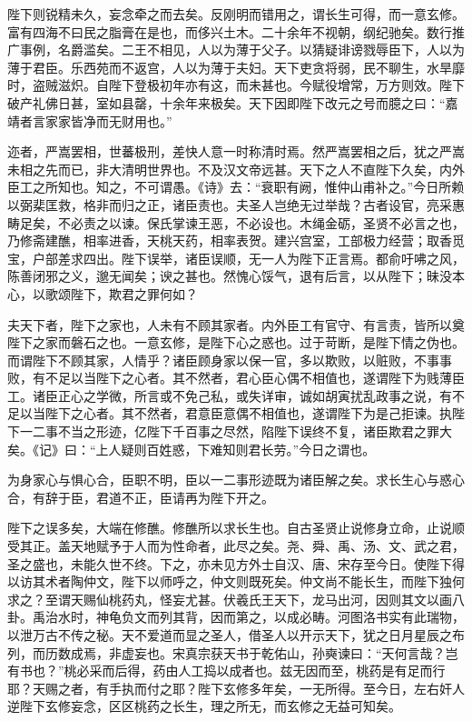 \documentclass[UTF8,titlepage,oneside]{ctexbook}
\begin{document}
陛下则锐精未久，妄念牵之而去矣。反刚明而错用之，谓长生可得，而一意玄修。富有四海不曰民之脂膏在是也，而侈兴土木。二十余年不视朝，纲纪驰矣。数行推广事例，名爵滥矣。二王不相见，人以为薄于父子。以猜疑诽谤戮辱臣下，人以为薄于君臣。乐西苑而不返宫，人以为薄于夫妇。天下吏贪将弱，民不聊生，水旱靡时，盗贼滋炽。自陛下登极初年亦有这，而未甚也。今赋役增常，万方则效。陛下破产礼佛日甚，室如县罄，十余年来极矣。天下因即陛下改元之号而臆之曰：“嘉靖者言家家皆净而无财用也。”

迩者，严嵩罢相，世蕃极刑，差快人意一时称清时焉。然严嵩罢相之后，犹之严嵩未相之先而已，非大清明世界也。不及汉文帝远甚。天下之人不直陛下久矣，内外臣工之所知也。知之，不可谓愚。《诗》去：“衰职有阙，惟仲山甫补之。”今日所赖以弼棐匡救，格非而归之正，诸臣责也。夫圣人岂绝无过举哉？古者设官，亮采惠畴足矣，不必责之以谏。保氏掌谏王恶，不必设也。木绳金砺，圣贤不必言之也，乃修斋建醮，相率进香，天桃天药，相率表贺。建兴宫室，工部极力经营；取香觅宝，户部差求四出。陛下误举，诸臣误顺，无一人为陛下正言焉。都俞吁咈之风，陈善闭邪之义，邈无闻矣；谀之甚也。然愧心馁气，退有后言，以从陛下；昧没本心，以歌颂陛下，欺君之罪何如？

夫天下者，陛下之家也，人未有不顾其家者。内外臣工有官守、有言责，皆所以奠陛下之家而磐石之也。一意玄修，是陛下心之惑也。过于苛断，是陛下情之伪也。而谓陛下不顾其家，人情乎？诸臣顾身家以保一官，多以欺败，以赃败，不事事败，有不足以当陛下之心者。其不然者，君心臣心偶不相值也，遂谓陛下为贱薄臣工。诸臣正心之学微，所言或不免己私，或失详审，诚如胡寅扰乱政事之说，有不足以当陛下之心者。其不然者，君意臣意偶不相值也，遂谓陛下为是己拒谏。执陛下一二事不当之形迹，亿陛下千百事之尽然，陷陛下误终不复，诸臣欺君之罪大矣。《记》曰：“上人疑则百姓惑，下难知则君长劳。”今日之谓也。

为身家心与惧心合，臣职不明，臣以一二事形迹既为诸臣解之矣。求长生心与惑心合，有辞于臣，君道不正，臣请再为陛下开之。

陛下之误多矣，大端在修醮。修醮所以求长生也。自古圣贤止说修身立命，止说顺受其正。盖天地赋予于人而为性命者，此尽之矣。尧、舜、禹、汤、文、武之君，圣之盛也，未能久世不终。下之，亦未见方外士自汉、唐、宋存至今日。使陛下得以访其术者陶仲文，陛下以师呼之，仲文则既死矣。仲文尚不能长生，而陛下独何求之？至谓天赐仙桃药丸，怪妄尤甚。伏羲氏王天下，龙马出河，因则其文以画八卦。禹治水时，神龟负文而列其背，因而第之，以成必畴。河图洛书实有此瑞物，以泄万古不传之秘。天不爱道而显之圣人，借圣人以开示天下，犹之日月星辰之布列，而历数成焉，非虚妄也。宋真宗获天书于乾佑山，孙奭谏曰：“天何言哉？岂有书也？”桃必采而后得，药由人工捣以成者也。兹无因而至，桃药是有足而行耶？天赐之者，有手执而付之耶？陛下玄修多年矣，一无所得。至今日，左右奸人逆陛下玄修妄念，区区桃药之长生，理之所无，而玄修之无益可知矣。
\end{document}
